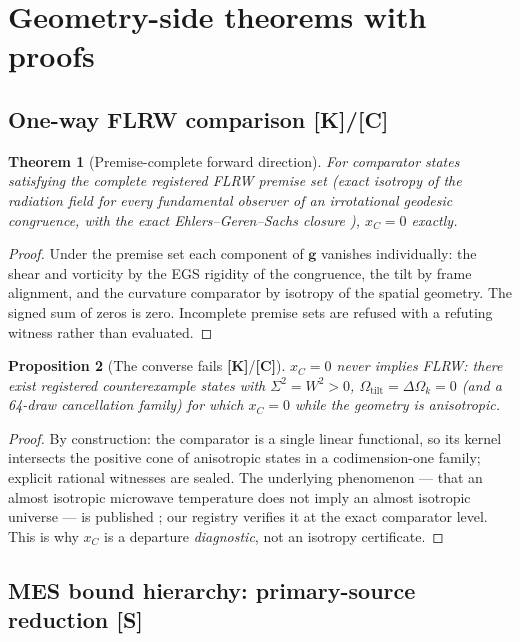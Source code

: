 \documentclass[10pt]{article}
\newtheorem{theorem}{Theorem}[section]
\newtheorem{proposition}[theorem]{Proposition}
\theoremstyle{definition}
\newcommand{\tier}[1]{\textbf{[#1]}}
\newcommand{\OmT}{\Omega_{\mathrm{tilt}}}
\newcommand{\dOk}{\Delta\Omega_{k}}
\begin{document}
\section{Geometry-side theorems with proofs}
\label{sec:geom}

\subsection{One-way FLRW comparison \tier{K}/\tier{C}}

\begin{theorem}[Premise-complete forward direction]
\label{thm:egs}
For comparator states satisfying the complete registered FLRW premise
set (exact isotropy of the radiation field for every fundamental
observer of an irrotational geodesic congruence, with the exact
Ehlers--Geren--Sachs closure \cite{EGS1968,
StoegerMaartensEllis1995}), $x_C = 0$ exactly.
\end{theorem}
\begin{proof}
Under the premise set each component of $\bm g$ vanishes individually:
the shear and vorticity by the EGS rigidity of the congruence, the
tilt by frame alignment, and the curvature comparator by isotropy of
the spatial geometry. The signed sum of zeros is zero. Incomplete
premise sets are refused with a refuting witness rather than
evaluated.
\end{proof}

\begin{proposition}[The converse fails \tier{K}/\tier{C}]
\label{prop:noconverse}
$x_C = 0$ never implies FLRW: there exist registered counterexample
states with $\Sigma^2 = W^2 > 0$, $\OmT = \dOk = 0$ (and a
64-draw cancellation family) for which $x_C = 0$ while the geometry is
anisotropic.
\end{proposition}
\begin{proof}
By construction: the comparator is a single linear functional, so its
kernel intersects the positive cone of anisotropic states in a
codimension-one family; explicit rational witnesses are sealed. The
underlying phenomenon --- that an almost isotropic microwave
temperature does not imply an almost isotropic universe --- is
published \cite{Nilsson1999}; our registry verifies it at the exact
comparator level. This is why $x_C$ is a departure \emph{diagnostic},
not an isotropy certificate.
\end{proof}

\subsection{MES bound hierarchy: primary-source reduction \tier{S}}
\label{sec:mes}
\end{document}
